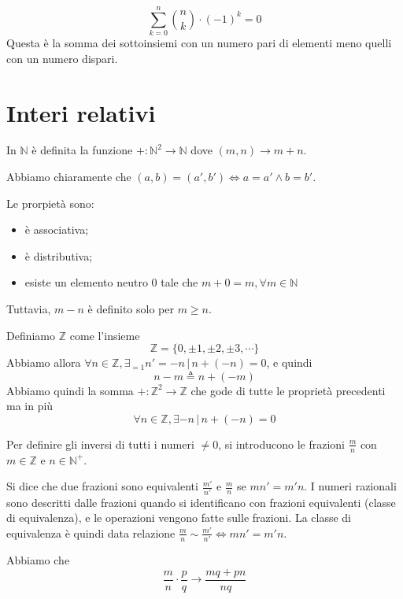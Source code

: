 \documentclass[a4paper]{article}
\begin{document}
\[
    \sum_{k=0}^n \binom{n}{k}\cdot {(-1)}^k = 0
\]
Questa è la somma dei sottoinsiemi con un numero pari di elementi meno quelli con un numero dispari.

\pagebreak

\section{Interi relativi}

In \(\mathbb{N}\) è definita la funzione \(+\colon {\mathbb{N}}^2 \to \mathbb{N}\)
dove \((m,n) \to m+n\).

Abbiamo chiaramente che \((a,b) = (a', b') \iff a=a' \land b=b'\).

Le prorpietà sono:
\begin{itemize}
    \item è associativa;
    \item è distributiva;
    \item esiste un elemento neutro \(0\) tale che \(m+0=m, \forall m \in \mathbb{N}\)
\end{itemize}

Tuttavia, \(m-n\) è definito solo per \(m \geq n\).

Definiamo \(\mathbb{Z}\) come l'insieme 
\[
    \mathbb{Z} = \{ 0, \pm 1, \pm 2, \pm 3, \cdots \}
\]
Abbiamo allora \(\forall n \in \mathbb{Z}, \exists_{=1} n'=-n \,|\, n+(-n) = 0\),
e quindi
\[
    n-m \triangleq n + (-m)
\]
Abbiamo quindi la somma \(+\colon {\mathbb{Z}}^2 \to \mathbb{Z}\)
che gode di tutte le proprietà precedenti ma in più 
\[
    \forall n \in \mathbb{Z}, \exists -n \,|\, n+(-n) = 0
\]

Per definire gli inversi di tutti i numeri \(\neq 0\), si introducono le frazioni \(\frac{m}{n}\)
con \(m\in\mathbb{Z}\) e \(n\in{\mathbb{N}}^+\).

Si dice che due frazioni sono equivalenti \(\frac{m'}{n'}\) e \(\frac{m}{n}\)
se \(mn' = m'n\).
I numeri razionali sono descritti dalle frazioni quando si identificano
con frazioni equivalenti (classe di equivalenza), e le operazioni vengono fatte sulle frazioni.
La classe di equivalenza è quindi data relazione \(\frac{m}{n} \sim \frac{m'}{n'} \iff mn'=m'n\).

Abbiamo che
\[
    \frac{m}{n} \cdot \frac{p}{q} \to \frac{mq+pn}{nq}
\]
\end{document}
